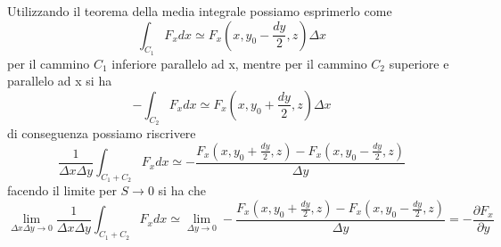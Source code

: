 Utilizzando il teorema della media integrale possiamo esprimerlo come 
\begin{equation*}
	\int_{C_1} F_x dx \simeq F_x(x,y_0-\frac{dy}{2},z)\Delta x  
\end{equation*}
per il cammino $C_1$ inferiore parallelo ad x, mentre per il cammino $C_2$ superiore e parallelo ad x si ha
\begin{equation*}
	-\int_{C_2}F_xdx \simeq F_x(x,y_0+ \frac{dy}{2},z)\Delta x
\end{equation*} 
di conseguenza possiamo riscrivere 
\begin{equation*}
	\frac{1}{\Delta x \Delta y}\int_{C_1+C_2}F_x dx \simeq - \frac{F_x(x,y_0+\frac{dy}{2},z) - F_x(x,y_0-\frac{dy}{2},z)}{\Delta y}
\end{equation*}
facendo il limite per $S \to 0$ si ha che
\begin{equation*}
	\lim_{\Delta x \Delta y \to 0 } \frac{1}{\Delta x \Delta y}\int_{C_1+C_2}F_x dx \simeq \lim_{\Delta y \to 0} - \frac{F_x(x,y_0+\frac{dy}{2},z) - F_x(x,y_0-\frac{dy}{2},z)}{\Delta y} =-\frac{\partial F_x}{\partial y}
\end{equation*}	

